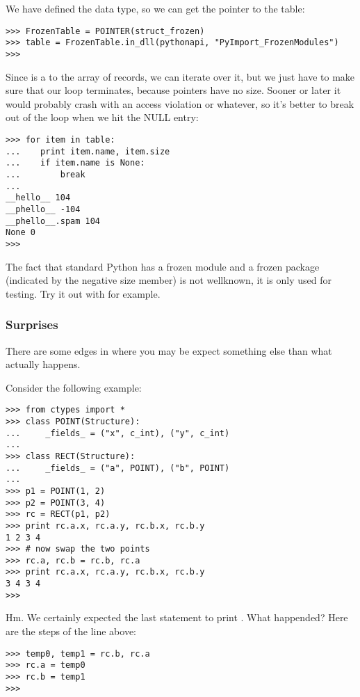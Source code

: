 We have defined the  data type, so we can get the
pointer to the table:
\begin{verbatim}
>>> FrozenTable = POINTER(struct_frozen)
>>> table = FrozenTable.in_dll(pythonapi, "PyImport_FrozenModules")
>>>
\end{verbatim}

Since  is a  to the array of 
records, we can iterate over it, but we just have to make sure that
our loop terminates, because pointers have no size. Sooner or later it
would probably crash with an access violation or whatever, so it's
better to break out of the loop when we hit the NULL entry:
\begin{verbatim}
>>> for item in table:
...    print item.name, item.size
...    if item.name is None:
...        break
...
__hello__ 104
__phello__ -104
__phello__.spam 104
None 0
>>>
\end{verbatim}

The fact that standard Python has a frozen module and a frozen package
(indicated by the negative size member) is not wellknown, it is only
used for testing. Try it out with  for example.


\subsubsection{Surprises\label{ctypes-surprises}}

There are some edges in  where you may be expect something
else than what actually happens.

Consider the following example:
\begin{verbatim}
>>> from ctypes import *
>>> class POINT(Structure):
...     _fields_ = ("x", c_int), ("y", c_int)
...
>>> class RECT(Structure):
...     _fields_ = ("a", POINT), ("b", POINT)
...
>>> p1 = POINT(1, 2)
>>> p2 = POINT(3, 4)
>>> rc = RECT(p1, p2)
>>> print rc.a.x, rc.a.y, rc.b.x, rc.b.y
1 2 3 4
>>> # now swap the two points
>>> rc.a, rc.b = rc.b, rc.a
>>> print rc.a.x, rc.a.y, rc.b.x, rc.b.y
3 4 3 4
>>>
\end{verbatim}

Hm. We certainly expected the last statement to print .
What happended? Here are the steps of the 
line above:
\begin{verbatim}
>>> temp0, temp1 = rc.b, rc.a
>>> rc.a = temp0
>>> rc.b = temp1
>>>
\end{verbatim}

